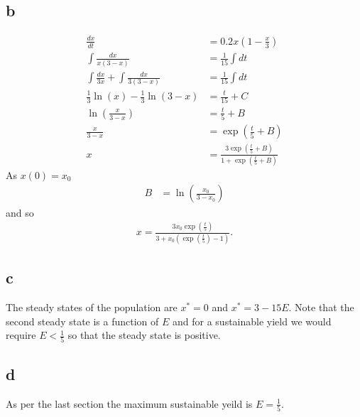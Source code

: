 \documentclass{unswmaths}
\begin{document}
\subsection*{b}
	\begin{align*}
		\frac{dx}{dt} &= 0.2x\left( 1 - \frac{x}{3} \right) \\
		\int \frac{dx}{x(3-x)} &= \frac{1}{15} \int dt \\
		\int \frac{dx}{3x} + \int \frac{dx}{3(3-x)} &= \frac{1}{15} \int dt \\
		\frac{1}{3} \ln(x) - \frac{1}{3} \ln(3-x) &= \frac{t}{15} + C \\
		\ln \left( \frac{x}{3-x} \right) &= \frac{t}{5} + B \\
		\frac{x}{3-x} &= \exp(\frac{t}{5} + B) \\
		x &= \frac{3\exp(\frac{t}{5} + B)}{1 + \exp(\frac{t}{5} + B)}
	\end{align*}
	As $ x(0) = x_0 $
	\begin{align*}
		B &= \ln \left( \frac{x_0}{3-x_0} \right)
	\end{align*}
	and so
	\begin{align*}
		x = \frac{3 x_0 \exp(\frac{t}{5})}{3 + x_0 (\exp(\frac{t}{5}) - 1)}.
	\end{align*}
\subsection*{c}
	The steady states of the population are
	$ x^* = 0 $ and $ x^* = 3 - 15E $. Note that the second steady state is a function of $ E $ and for a sustainable yield we would require $ E < \frac{1}{5} $ so that the steady state is positive.
	
\subsection*{d}
	As per the last section the maximum sustainable yeild is $ E = \frac{1}{5} $.
\end{document}
